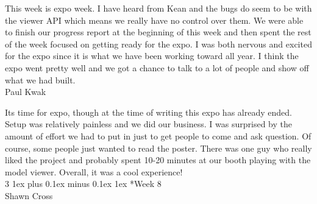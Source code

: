 \documentclass[letterpaper, 10pt, draftclsnofoot, compsoc, onecolumn]{IEEEtran}
\makeatletter
\def\subsubsection{\@startsection{subsubsection}%
                                 {3}%
                                 {\z@}%
                                 {1ex plus 0.1ex minus 0.1ex}%
                                 {1ex}%
                                 {\normalfont\normalsize}}%
\makeatother
\begin{document}
This week is expo week. I have heard from Kean and the bugs do seem to be with the viewer API which means we really have no control over them. We were able to finish our progress report at the beginning of this week and then spent the rest of the week focused on getting ready for the expo. I was both nervous and excited for the expo since it is what we have been working toward all year. I think the expo went pretty well and we got a chance to talk to a lot of people and show off what we had built.\\

Paul Kwak

Its time for expo, though at the time of writing this expo has already ended. Setup was relatively painless and we did our business. I was surprised by the amount of effort we had to put in just to get people to come and ask question. Of course, some people just wanted to read the poster. There was one guy who really liked the project and probably spent 10-20 minutes at our booth playing with the model viewer. Overall, it was a cool experience!\\

\subsubsection*{Week 8}\hspace*{\fill} \\
Shawn Cross
\end{document}
